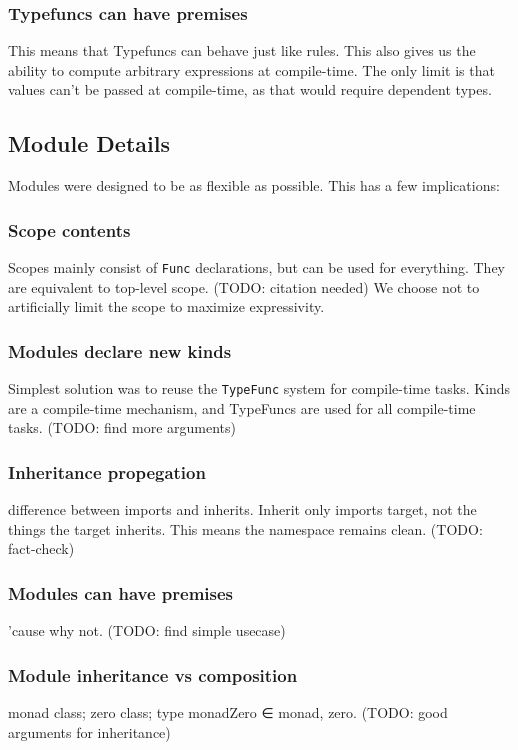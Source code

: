 \begin{multicols}{2}

  \subsubsection*{Typefuncs can have premises}
  This means that Typefuncs can behave just like rules.
  This also gives us the ability to compute arbitrary expressions at compile-time.
  The only limit is that values can't be passed at compile-time, as that would require dependent types.

\end{multicols}

\pagebreak
\subsection{Module Details}
\begin{multicols}{2}\noindent
  Modules were designed to be as flexible as possible.
  This has a few implications:

  \subsubsection*{Scope contents}
  Scopes mainly consist of \texttt{Func} declarations, but can be used for everything.
  They are equivalent to top-level scope. (TODO: citation needed) 
  We choose not to artificially limit the scope to maximize expressivity.

  \subsubsection*{Modules declare new kinds}
  Simplest solution was to reuse the \texttt{TypeFunc} system for compile-time tasks.
  Kinds are a compile-time mechanism, and TypeFuncs are used for all compile-time tasks.
  (TODO: find more arguments)

  \subsubsection*{Inheritance propegation}
  difference between imports and inherits.
  Inherit only imports target, not the things the target inherits.
  This means the namespace remains clean. (TODO: fact-check)

  \subsubsection*{Modules can have premises}
  'cause why not. (TODO: find simple usecase)

  \subsubsection*{Module inheritance vs composition}
  monad class; zero class; type monadZero ∈ monad, zero.
  (TODO: good arguments for inheritance)

\end{multicols}


